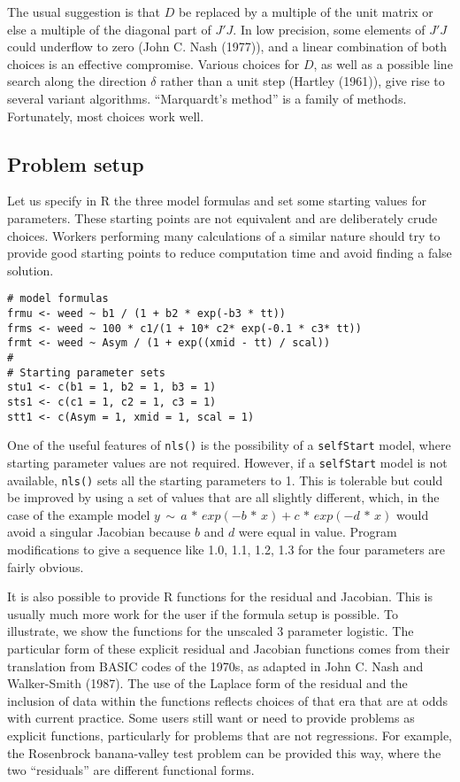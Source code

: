 The usual suggestion is that \(D\) be replaced by a multiple of the unit matrix or else
a multiple of the diagonal part of \(J' J\). In low precision, some elements of
\(J' J\) could underflow to zero (John C. Nash (1977)), and a linear combination of both
choices is an effective compromise. Various choices for
\(D\), as well as a possible line search along the
direction \(\delta\) rather than a unit step (Hartley (1961)),
give rise to several variant
algorithms. ``Marquardt's method'' is a family of methods. Fortunately, most choices
work well.

\hypertarget{problem-setup}{%
\subsection{Problem setup}\label{problem-setup}}

Let us specify in R the three model formulas and set some starting
values for parameters. These starting points are not equivalent and
are deliberately crude choices. Workers performing many calculations
of a similar nature should try to provide good starting points to reduce
computation time and avoid finding a false solution.

\begin{verbatim}
# model formulas
frmu <- weed ~ b1 / (1 + b2 * exp(-b3 * tt))
frms <- weed ~ 100 * c1/(1 + 10* c2* exp(-0.1 * c3* tt))
frmt <- weed ~ Asym / (1 + exp((xmid - tt) / scal))
#
# Starting parameter sets
stu1 <- c(b1 = 1, b2 = 1, b3 = 1)
sts1 <- c(c1 = 1, c2 = 1, c3 = 1)
stt1 <- c(Asym = 1, xmid = 1, scal = 1)
\end{verbatim}

One of the useful features of \texttt{nls()} is the possibility of a \texttt{selfStart} model,
where starting parameter values are not required. However, if a \texttt{selfStart} model
is not available, \texttt{nls()} sets all the starting parameters
to 1. This is tolerable but could be improved by using a set of values
that are all slightly different, which, in the case of the example
model \(y \,\sim\, a \,*\, exp(-b \,*\, x) + c\,*\,exp(-d \,*\, x)\)
would avoid a singular Jacobian because \(b\) and \(d\) were equal in value.
Program modifications to give a sequence like 1.0, 1.1, 1.2, 1.3 for the four
parameters are fairly obvious.

It is also possible to provide R functions for the residual and Jacobian.
This is usually much more work for the user if the formula setup is possible.
To illustrate, we show the functions for the unscaled 3 parameter logistic.
The particular form of these explicit residual and Jacobian functions comes from
their translation from BASIC codes of the 1970s, as adapted in John C. Nash and Walker-Smith (1987). The use
of the Laplace form of the residual and the inclusion of data within the functions
reflects choices of that era that are at odds with current practice. Some users
still want or need to provide problems as explicit functions, particularly
for problems that are not regressions. For example, the Rosenbrock banana-valley
test problem can be provided this way, where the two ``residuals'' are different
functional forms.

